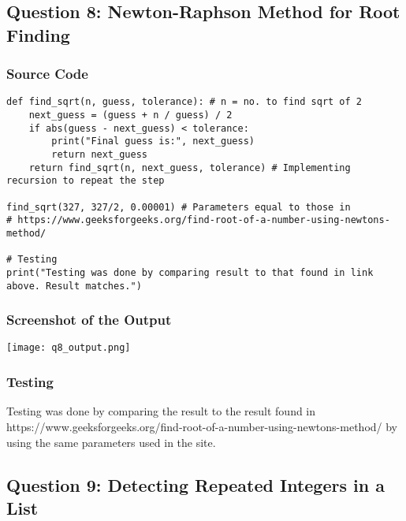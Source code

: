 \documentclass{article}
\begin{document}
\subsection*{Question 8: Newton-Raphson Method for Root Finding}
\subsubsection*{Source Code}
\begin{lstlisting}
def find_sqrt(n, guess, tolerance): # n = no. to find sqrt of 2
    next_guess = (guess + n / guess) / 2
    if abs(guess - next_guess) < tolerance:
        print("Final guess is:", next_guess)
        return next_guess
    return find_sqrt(n, next_guess, tolerance) # Implementing recursion to repeat the step

find_sqrt(327, 327/2, 0.00001) # Parameters equal to those in
# https://www.geeksforgeeks.org/find-root-of-a-number-using-newtons-method/

# Testing
print("Testing was done by comparing result to that found in link above. Result matches.")
\end{lstlisting}

\subsubsection*{Screenshot of the Output}
\texttt{[image: q8\_output.png]}

\subsubsection*{Testing}
Testing was done by comparing the result to the result found in https://www.geeksforgeeks.org/find-root-of-a-number-using-newtons-method/ by using the same parameters used in the site.

\subsection*{Question 9: Detecting Repeated Integers in a List}
\end{document}
